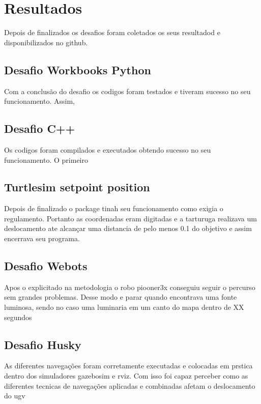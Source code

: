 \chapter{Resultados}
\label{chap:result}

Depois de finalizados os desafios foram coletados os seus resultadod e disponibilizados no github.

\section{Desafio Workbooks Python}

Com a conclusão do desafio os codigos foram testados e tiveram sucesso no seu funcionamento. Assim, 

\section{Desafio C++}

Os codigos foram compilados e executados obtendo sucesso no seu funcionamento. O primeiro

\section{Turtlesim setpoint position}

Depois de finalizado o package tinah seu funcionamento como exigia o regulamento. Portanto as coordenadas eram digitadas e a tarturuga realizava um deslocamento ate alcançar uma distancia de pelo menos 0.1 do objetivo e assim encerrava seu programa.

\section{Desafio Webots}

Apos o explicitado na metodologia o robo piooner3x conseguiu seguir o percurso sem grandes problemas. Desse modo e parar quando encontrava uma fonte luminosa, sendo no caso uma luminaria em um canto do mapa dentro de XX segundos

\section{Desafio Husky}

As diferentes navegações foram corretamente executadas e colocadas em prstica dentro dos simuladores gazebosim e rviz. Com isso foi capaz perceber como as diferentes tecnicas de navegações aplicadas e combinadas afetam o deslocamento do ugv


